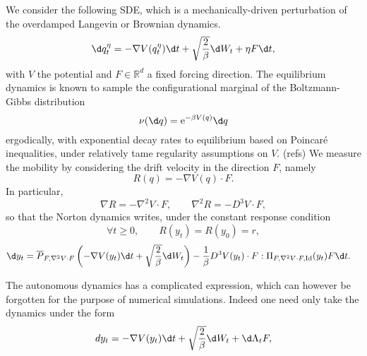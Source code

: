
\begin{example}\label{ex:norton_overdamped_langevin}
We consider the following SDE, which is a mechanically-driven perturbation of the overdamped Langevin or Brownian dynamics.
\begin{equation}
    \d q^\eta_t = -\nabla V(q^\eta_t)\d t +\sqrt{\frac2{\beta}}\d W_t + \eta F\d t,
\end{equation}
with $V$ the potential and $F\in \mathbb{R}^d$ a fixed forcing direction.
The equilibrium dynamics is known to sample the configurational marginal of the Boltzmann-Gibbs distribution 
\[\nu(\d q) = \mathrm{e}^{-\beta V(q)}\d q\]
ergodically, with exponential decay rates to equilibrium based on Poincaré inequalities, under relatively tame regularity assumptions on $V$. (refs)
We measure the mobility by considering the drift velocity in the direction $F$, namely
\[R(q)=-\nabla V(q)\cdot F.\]
In particular,
\[ \nabla R = -\nabla^2 V\cdot F, \qquad \nabla^2 R = - D^3 V \cdot F,\]
so that the Norton dynamics writes, under the constant response condition
\[\forall t\geq 0,\qquad R(y_t)=R(y_0)=r,\]
\begin{equation}
    \begin{aligned}
    \label{eq:norton_overdamped_equation}
    \d y_t &= \overline{P}_{F,\nabla^2 V\cdot F}\left(-\nabla V(y_t)\d t + \sqrt{\frac{2}\beta}\d W_t\right) - \frac1\beta D^3 V(y_t)\cdot F : \Pi_{F,\nabla^2 V\cdot F,\mathrm{Id}}(y_t)F\d t.
    \end{aligned}
\end{equation}

The autonomous dynamics has a complicated expression, which can however be forgotten for the purpose of numerical simulations. Indeed one need only take the dynamics under the form 
\[d y_t = -\nabla V(y_t)\d t +\sqrt{\frac2{\beta}}\d W_t + \d \Lambda_t F,\]
\end{example}